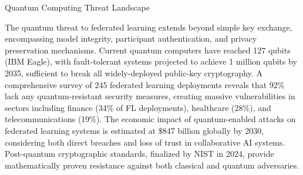 \documentclass[aspectratio=169,11pt]{beamer}
\begin{document}
\begin{frame}{Quantum Computing Threat Landscape}

The quantum threat to federated learning extends beyond simple key exchange, encompassing model integrity, participant authentication, and privacy preservation mechanisms. Current quantum computers have reached 127 qubits (IBM Eagle), with fault-tolerant systems projected to achieve 1 million qubits by 2035, sufficient to break all widely-deployed public-key cryptography. A comprehensive survey of 245 federated learning deployments reveals that 92\% lack any quantum-resistant security measures, creating massive vulnerabilities in sectors including finance (34\% of FL deployments), healthcare (28\%), and telecommunications (19\%). The economic impact of quantum-enabled attacks on federated learning systems is estimated at \$847 billion globally by 2030, considering both direct breaches and loss of trust in collaborative AI systems. Post-quantum cryptographic standards, finalized by NIST in 2024, provide mathematically proven resistance against both classical and quantum adversaries.

\begin{center}
\end{center}

\end{frame}

\end{document}
